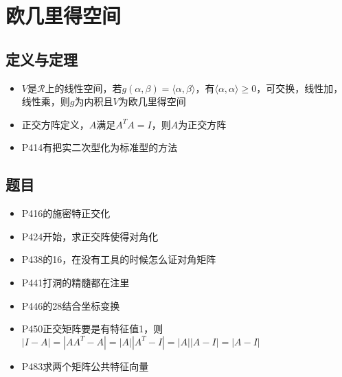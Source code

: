 \documentclass[UTF8]{ctexart}
\begin{document}
\section{欧几里得空间}
\subsection{定义与定理}
\begin{itemize}
\item $V$是$\mathcal{R}$上的线性空间，若$g(\alpha,\beta)=\langle\alpha,\beta\rangle$，有$\langle\alpha,\alpha\rangle\geq 0$，可交换，线性加，线性乘，则$g$为内积且$V$为欧几里得空间

\item 正交方阵定义，$A$满足$A^TA=I$，则$A$为正交方阵

\item P414有把实二次型化为标准型的方法
\end{itemize}

\subsection{题目}
\begin{itemize}
\item P416的施密特正交化
\item P424开始，求正交阵使得对角化
\item P438的16，在没有工具的时候怎么证对角矩阵
\item P441打洞的精髓都在注里
\item P446的28结合坐标变换
\item P450正交矩阵要是有特征值1，则$|I-A|=|AA^T-A|=|A||A^T-I|=|A||A-I|=|A-I|$
\item P483求两个矩阵公共特征向量
\end{itemize}
\end{document}
